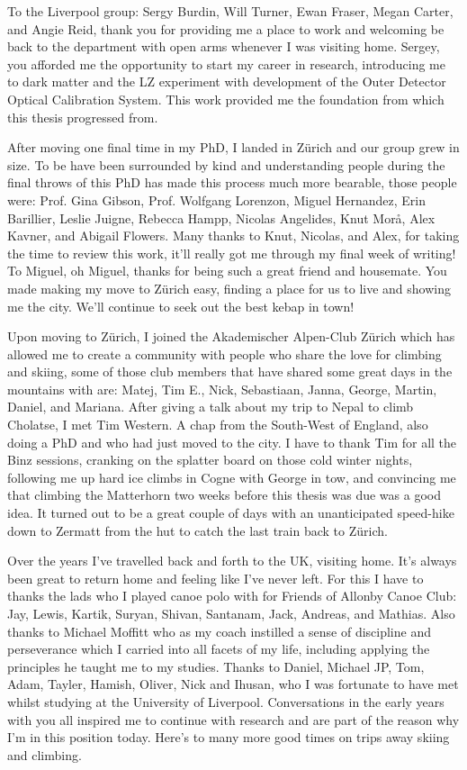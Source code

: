 \documentclass[a4paper,11pt,usegeometry]{scrreprt} %
\begin{document}
To the Liverpool group: Sergy Burdin, Will Turner, Ewan Fraser, Megan Carter, and Angie Reid, thank you for providing me a place to work and welcoming be back to the department with open arms whenever I was visiting home. Sergey, you afforded me the opportunity to start my career in research, introducing me to dark matter and the LZ experiment with development of the Outer Detector Optical Calibration System. This work provided me the foundation from which this thesis progressed from.

After moving one final time in my PhD, I landed in Z\"urich and our group grew in size. To be have been surrounded by kind and understanding people during the final throws of this PhD has made this process much more bearable, those people were: Prof. Gina Gibson, Prof. Wolfgang Lorenzon, Miguel Hernandez, Erin Barillier, Leslie Juigne, Rebecca Hampp, Nicolas Angelides, Knut Mor\aa, Alex Kavner, and Abigail Flowers. Many thanks to Knut, Nicolas, and Alex, for taking the time to review this work, it'll really got me through my final week of writing! To Miguel, oh Miguel, thanks for being such a great friend and housemate. You made making my move to Z\"urich easy, finding a place for us to live and showing me the city. We'll continue to seek out the best kebap in town!

Upon moving to Z\"urich, I joined the Akademischer Alpen-Club Z\"urich which has allowed me to  create a community with people who share the love for climbing and skiing, some of those club members that have shared some great days in the mountains with are: Matej, Tim E., Nick, Sebastiaan, Janna, George, Martin, Daniel, and Mariana. After giving a talk about my trip to Nepal to climb Cholatse, I met Tim Western. A chap from the South-West of England, also doing a PhD and who had just moved to the city. I have to thank Tim for all the Binz sessions, cranking on the splatter board on those cold winter nights, following me up hard ice climbs in Cogne with George in tow, and convincing me that climbing the Matterhorn two weeks before this thesis was due was a good idea. It turned out to be a great couple of days with an unanticipated speed-hike down to Zermatt from the hut to catch the last train back to Z\"urich.

Over the years I've travelled back and forth to the UK, visiting home. It's always been great to return home and feeling like I've never left. For this I have to thanks the lads who I played canoe polo with for Friends of Allonby Canoe Club: Jay, Lewis, Kartik, Suryan, Shivan, Santanam, Jack, Andreas, and Mathias. Also thanks to Michael Moffitt who as my coach instilled a sense of discipline and perseverance which I carried into all facets of my life, including applying the principles he taught me to my studies. Thanks to Daniel, Michael JP, Tom, Adam, Tayler, Hamish, Oliver, Nick and Ihusan, who I was fortunate to have met whilst studying at the University of Liverpool. Conversations in the early years with you all inspired me to continue with research and are part of the reason why I'm in this position today. Here's to many more good times on trips away skiing and climbing.
\end{document}
